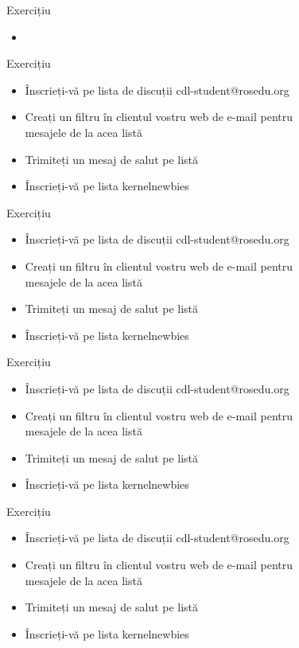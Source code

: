 \documentclass{beamer}
\begin{document}
    \begin{frame}{Exercițiu}
    \begin{itemize}
    \setlength{\itemsep}{0.5cm}
    \item 
    \end{itemize}
    \end{frame}

    \begin{frame}{Exercițiu}
    \begin{itemize}
    \setlength{\itemsep}{0.5cm}
    \item Înscrieți-vă pe lista de discuții cdl-student@rosedu.org
    \item Creați un filtru în clientul vostru web de e-mail pentru \\
        mesajele de la acea listă
    \item Trimiteți un mesaj de salut pe listă
    \item Înscrieți-vă pe lista kernelnewbies
    \end{itemize}
    \end{frame}
    \begin{frame}{Exercițiu}
    \begin{itemize}
    \setlength{\itemsep}{0.5cm}
    \item Înscrieți-vă pe lista de discuții cdl-student@rosedu.org
    \item Creați un filtru în clientul vostru web de e-mail pentru \\
        mesajele de la acea listă
    \item Trimiteți un mesaj de salut pe listă
    \item Înscrieți-vă pe lista kernelnewbies
    \end{itemize}
    \end{frame}
    \begin{frame}{Exercițiu}
    \begin{itemize}
    \setlength{\itemsep}{0.5cm}
    \item Înscrieți-vă pe lista de discuții cdl-student@rosedu.org
    \item Creați un filtru în clientul vostru web de e-mail pentru \\
        mesajele de la acea listă
    \item Trimiteți un mesaj de salut pe listă
    \item Înscrieți-vă pe lista kernelnewbies
    \end{itemize}
    \end{frame}
    \begin{frame}{Exercițiu}
    \begin{itemize}
    \setlength{\itemsep}{0.5cm}
    \item Înscrieți-vă pe lista de discuții cdl-student@rosedu.org
    \item Creați un filtru în clientul vostru web de e-mail pentru \\
        mesajele de la acea listă
    \item Trimiteți un mesaj de salut pe listă
    \item Înscrieți-vă pe lista kernelnewbies
    \end{itemize}
    \end{frame}
\end{document}

